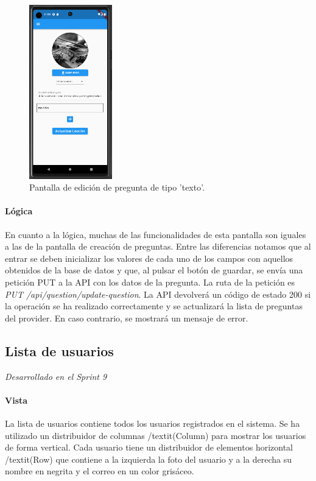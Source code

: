 \begin{figure}[H]
  \centering
  \includegraphics[width=0.32\textwidth]{imagenes/c7/editarpreguntatexto.png}
  \caption{Pantalla de edición de pregunta de tipo 'texto'.} 
  \label{fig:edición_pregunta_tecto}
\end{figure}


\paragraph*{Lógica}
En cuanto a la lógica, muchas de las funcionalidades de esta pantalla son iguales a las de la pantalla de creación de preguntas.
Entre las diferencias notamos que al entrar se deben inicializar los valores de cada uno de los campos con aquellos obtenidos de
 la base de datos y que, al pulsar el botón de guardar, se envía una petición PUT a la API con los datos de la pregunta. 
 La ruta de la petición es \textit{PUT /api/question/update-question}. La API devolverá un código de estado 200 si 
 la operación se ha realizado correctamente y se actualizará la lista de preguntas del provider. En caso contrario, se mostrará un mensaje de error.


\newpage
\subsection{Lista de usuarios} 

\textit{Desarrollado en el Sprint 9}

\paragraph*{Vista}
La lista de usuarios contiene todos los usuarios registrados en el sistema. Se ha utilizado un distribuidor de columnas /textit{(Column)} para mostrar los usuarios de forma vertical. 
Cada usuario tiene un distribuidor de elementos horizontal /textit{(Row)} que contiene a la izquierda la foto del usuario y 
a la derecha su nombre en negrita y el correo en un color grisáceo. 

